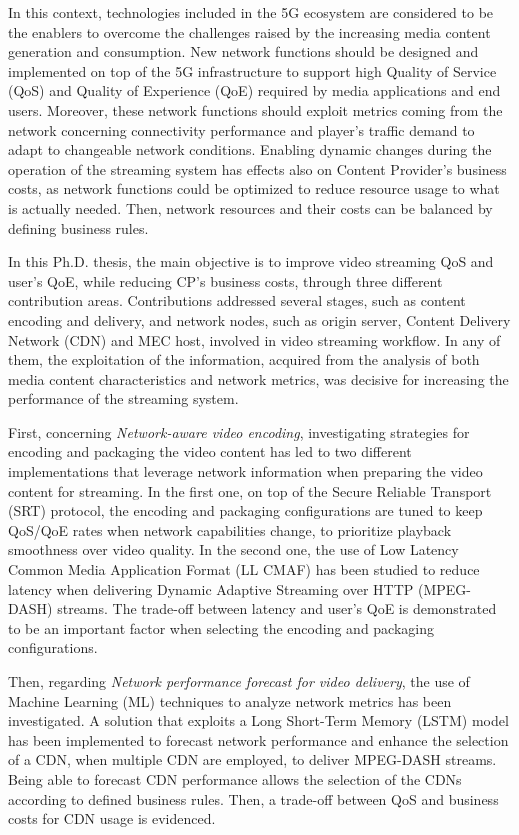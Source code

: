 \begin{abstracts}
In this context, technologies included in the 5G ecosystem are considered to be the enablers to overcome the challenges raised by the increasing media content generation and consumption. New network functions should be designed and implemented on top of the 5G infrastructure to support high Quality of Service (QoS) and Quality of Experience (QoE) required by media applications and end users. Moreover, these network functions should exploit metrics coming from the network concerning connectivity performance and player's traffic demand to adapt to changeable network conditions. Enabling dynamic changes during the operation of the streaming system has effects also on Content Provider's business costs, as network functions could be optimized to reduce resource usage to what is actually needed. Then, network resources and their costs can be balanced by defining business rules.

In this Ph.D. thesis, the main objective is to improve video streaming QoS and user's QoE, while reducing CP's business costs, through three different contribution areas. Contributions addressed several stages, such as content encoding and delivery, and network nodes, such as origin server, Content Delivery Network (CDN) and MEC host, involved in video streaming workflow. In any of them, the exploitation of the information, acquired from the analysis of both media content characteristics and network metrics, was decisive for increasing the performance of the streaming system.

First, concerning \textit{Network-aware video encoding}, investigating strategies for encoding and packaging the video content has led to two different implementations that leverage network information when preparing the video content for streaming.
In the first one, on top of the Secure Reliable Transport (SRT) protocol, the encoding and packaging configurations are tuned to keep QoS/QoE rates when network capabilities change, to prioritize playback smoothness over video quality.
In the second one, the use of Low Latency Common Media Application Format (LL CMAF) has been studied to reduce latency when delivering Dynamic Adaptive Streaming over HTTP (MPEG-DASH) streams. The trade-off between latency and user's QoE is demonstrated to be an important factor when selecting the encoding and packaging configurations.

Then, regarding \textit{Network performance forecast for video delivery}, the use of Machine Learning (ML) techniques to analyze network metrics has been investigated. A solution that exploits a Long Short-Term Memory (LSTM) model has been implemented to forecast network performance and enhance the selection of a CDN, when multiple CDN are employed, to deliver MPEG-DASH streams. Being able to forecast CDN performance allows the selection of the CDNs according to defined business rules. Then, a trade-off between QoS and business costs for CDN usage is evidenced.


\end{abstracts}
